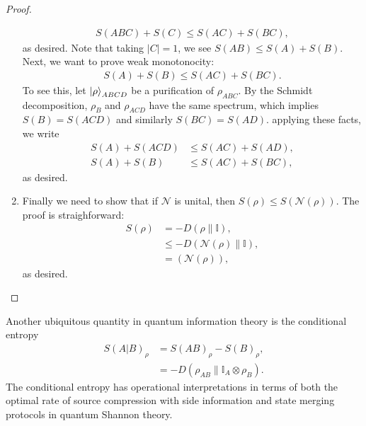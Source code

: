 \documentclass[notoc]{tufte-book}
\begin{document}
\begin{proof}
\begin{enumerate}
    \begin{align}
        S(ABC) + S(C) \leq S(AC) + S(BC),
    \end{align}
    as desired. Note that taking $|C|=1$, we see $S(AB)\leq S(A)+S(B).$ Next, we want to prove weak monotonocity: 
    \begin{align}
        S(A) + S(B) \leq S(AC)+S(BC).
    \end{align} To see this, let $\ket{\rho}_{ABCD}$ be a purification of $\rho_{ABC}$. By the Schmidt decomposition, $\rho_B$ and $\rho_{ACD}$ have the same spectrum, which implies $S(B)=S(ACD)$ and similarly $S(BC)=S(AD)$. applying these facts, we write
    \begin{align}
        S(A) +S(ACD) &\leq S(AC) +S(AD), \\
        S(A) + S(B) &\leq S(AC) + S(BC),
    \end{align}
    as desired. 
    
    \item Finally we need to show that if $\mathcal{N}$ is unital, then $S(\rho) \leq S(\mathcal{N}(\rho))$. The proof is straighforward:
    \begin{align}
        S(\rho)&= -D(\rho \| \mathbb{I}), \\
        &\leq -D(\mathcal{N}(\rho) \| \mathcal{\mathbb{I}}),\\
        &= (\mathcal{N}(\rho)),
    \end{align}
    as desired. 
\end{enumerate}
\end{proof}

Another ubiquitous quantity in quantum information theory is the conditional entropy
\begin{align}\label{eq:conditional-entropy}
    S(A|B)_{\rho} &= S(AB)_{\rho} -S(B)_{\rho},\\
    &= -D(\rho_{AB}\| \mathbb{I}_A \otimes \rho_B).
\end{align}
The conditional entropy has operational interpretations in terms of both the optimal rate of source compression with side information and state merging protocols in quantum Shannon theory.
\end{document}
